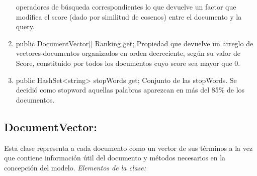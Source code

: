 \documentclass[a4paper,12pt,twocolumn]{article}
\begin{document}
\begin{enumerate}
        operadores de búsqueda correspondientes lo que devuelve un factor que modifica el
        score (dado por similitud de cosenos) entre el documento y la query.
    \item public DocumentVector[] Ranking { get;}
        Propiedad que devuelve un arreglo de vectores-documentos organizados en orden
        decreciente, según su valor de Score, constituido por todos los documentos cuyo score
        sea mayor que 0.
    \item public HashSet<string> stopWords { get;}
        Conjunto de las stopWords. Se decidió como stopword aquellas palabras aparezcan en
        más del 85\% de los documentos.
\end{enumerate}


\subsection{DocumentVector:}
Esta clase representa a cada documento como un vector de sus términos
a la vez que contiene información útil del documento y métodos necesarios en la concepción
del modelo.
\emph{Elementos de la clase:}
\end{document}
